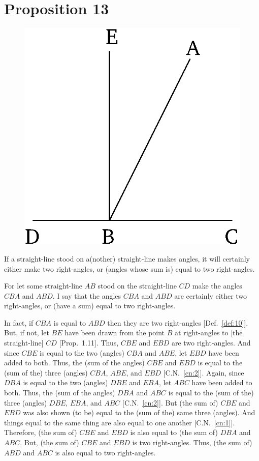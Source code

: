 \chapter*{Proposition 13}
\label{prop:13}

\begin{figure}[ht]
    \begin{center}
    \includegraphics[width=0.5\linewidth]{figures/fig13e.eps}
    \label{fig:prop_13}
    \end{center}
\end{figure}

If a straight-line stood on a(nother)  straight-line makes angles,
it will certainly either make two right-angles, or (angles whose sum is) equal
to two right-angles. 

For  let some straight-line $AB$ stood on the straight-line $CD$ make the
angles $CBA$ and $ABD$. I say that the angles $CBA$ and $ABD$ are
certainly either two right-angles, or (have a sum) equal to two right-angles.

In fact, if $CBA$ is equal to $ABD$ then they are two right-angles [Def.~\ref{def:10}].
But, if not, let $BE$ have been drawn from the point $B$ at right-angles to [the
straight-line] $CD$ [Prop.~1.11]. Thus, $CBE$ and $EBD$ are two right-angles.
And since $CBE$ is equal to the two (angles) $CBA$ and $ABE$, let $EBD$ have been added
to both. Thus, the (sum of the angles) $CBE$ and $EBD$ is equal to the  (sum of the) three (angles)
$CBA$, $ABE$, and $EBD$ [C.N.~\ref{cn:2}]. Again, since $DBA$ is equal to the two (angles) $DBE$
and $EBA$, let $ABC$ have been added to both. Thus, the (sum of the angles) $DBA$ and $ABC$ is
equal to the (sum of the) three (angles) $DBE$, $EBA$, and $ABC$ [C.N.~\ref{cn:2}]. But (the sum of) $CBE$ and $EBD$ was
also shown (to be) equal to the (sum of the) same three (angles). And things equal to the
same thing are also equal to one another [C.N.~\ref{cn:1}]. Therefore, 
(the sum of) $CBE$ and
$EBD$ is also equal to (the sum of) $DBA$ and $ABC$. But, (the sum of) $CBE$ and $EBD$ is two
right-angles. Thus, (the sum of) $ABD$ and $ABC$ is also equal to two right-angles.

